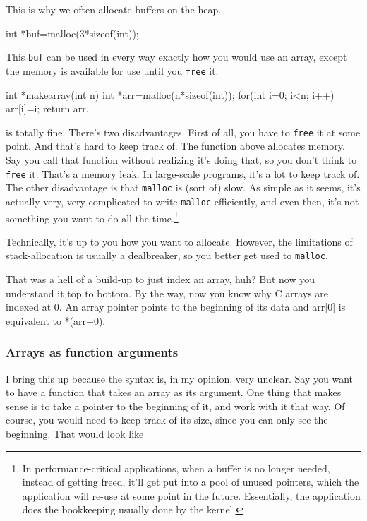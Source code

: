\documentclass[ebook,11pt,oneside,openany]{memoir}
\newcommand{\cf}[1]{\texttt{#1}}
\begin{document}
This is why we often allocate buffers on the heap. 

\begin{code}[language=C]
int *buf=malloc(3*sizeof(int));
\end{code}

This \cf{buf} can be used in every way exactly how you would use an array, except the memory is available for use until you \cf{free} it. 

\begin{code}[language=C]
int *makearray(int n) 
{
  int *arr=malloc(n*sizeof(int));
  for(int i=0; i<n; i++) 
  	arr[i]=i;
  return arr.
}
\end{code}

is totally fine. There's two disadvantages. First of all, you have to \texttt{free} it at some point. And that's hard to keep track of. The function above allocates memory. Say you call that function without realizing it's doing that, so you don't think to \texttt{free} it. That's a memory leak. In large-scale programs, it's a lot to keep track of. The other disadvantage is that \texttt{malloc} is (sort of) slow. As simple as it seems, it's actually very, very complicated to write \texttt{malloc} efficiently, and even then, it's not something you want to do all the time.\footnote{In performance-critical applications, when a buffer is no longer needed, instead of getting freed, it'll get put into a pool of unused pointers, which the application will re-use at some point in the future. Essentially, the application does the bookkeeping usually done by the kernel.}

Technically, it's up to you how you want to allocate. However, the limitations of stack-allocation is usually a dealbreaker, so you better get used to \texttt{malloc}.

That was a hell of a build-up to just index an array, huh? But now you understand it top to bottom. By the way, now you know why C arrays are indexed at 0. An array pointer points to the beginning of its data and arr[0] is equivalent to *(arr+0).

\subsubsection{Arrays as function arguments}

I bring this up because the syntax is, in my opinion, very unclear. Say you want to have a function that takes an array as its argument. One thing that makes sense is to take a pointer to the beginning of it, and work with it that way. Of course, you would need to keep track of its size, since you can only see the beginning. That would look like
\end{document}
